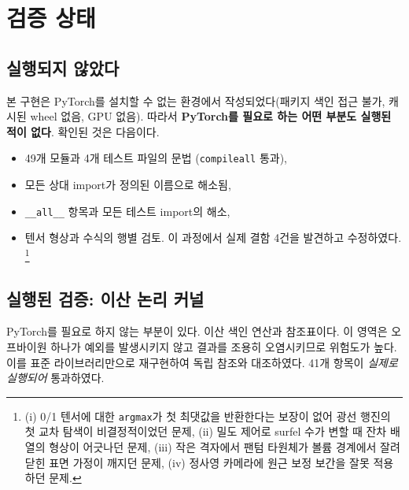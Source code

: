 \section{검증 상태}
\label{sec:impl-status}

\subsection{실행되지 않았다}

본 구현은 PyTorch를 설치할 수 없는 환경에서 작성되었다(패키지 색인 접근 불가, 캐시된
wheel 없음, GPU 없음). 따라서 \textbf{PyTorch를 필요로 하는 어떤 부분도 실행된 적이
없다}. 확인된 것은 다음이다.

\begin{itemize}[leftmargin=2em]
  \item 49개 모듈과 4개 테스트 파일의 문법 (\texttt{compileall} 통과),
  \item 모든 상대 import가 정의된 이름으로 해소됨,
  \item \texttt{\_\_all\_\_} 항목과 모든 테스트 import의 해소,
  \item 텐서 형상과 수식의 행별 검토. 이 과정에서 실제 결함 4건을 발견하고 수정하였다.
  \footnote{(i) 0/1 텐서에 대한 \texttt{argmax}가 첫 최댓값을 반환한다는 보장이 없어
  광선 행진의 첫 교차 탐색이 비결정적이었던 문제, (ii) 밀도 제어로 surfel 수가 변할 때
  잔차 배열의 형상이 어긋나던 문제, (iii) 작은 격자에서 팬텀 타원체가 볼륨 경계에서
  잘려 닫힌 표면 가정이 깨지던 문제, (iv) 정사영 카메라에 원근 보정 보간을 잘못
  적용하던 문제.}
\end{itemize}

\subsection{실행된 검증: 이산 논리 커널}
\label{sec:kernel-verification}

PyTorch를 필요로 하지 않는 부분이 있다. 이산 색인 연산과 참조표이다. 이 영역은
오프바이원 하나가 예외를 발생시키지 않고 결과를 조용히 오염시키므로 위험도가 높다.
이를 표준 라이브러리만으로 재구현하여 독립 참조와 대조하였다. 41개 항목이
\emph{실제로 실행되어} 통과하였다.

